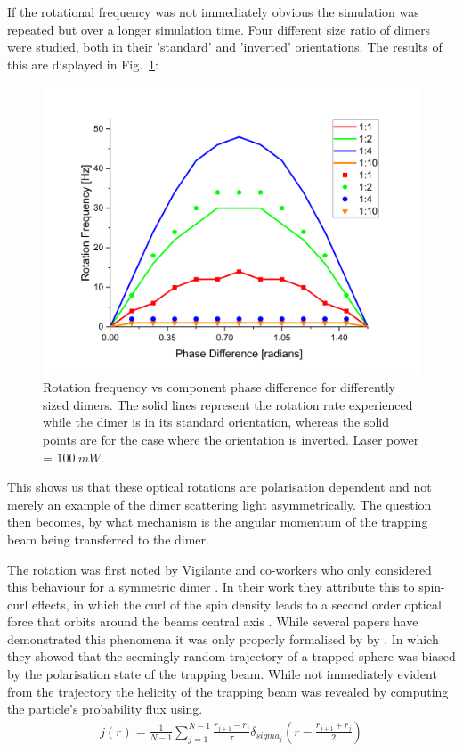 If the rotational frequency was not immediately obvious the simulation was
repeated but over a longer simulation time. Four different size ratio of 
dimers were studied, both in their 'standard' and 'inverted' orientations. 
The results of this are displayed in Fig.~\ref{fig:rotation_vs_pol}:
\begin{figure}[h!]
	\centering
	\includegraphics[width=\linewidth]{rotation_vs_pol.png}
	\caption{Rotation frequency vs component phase difference for 
		differently sized dimers. The solid lines represent the 
		rotation rate experienced while the dimer is in its standard 
		orientation, whereas the solid points are for the case 
		where the orientation is inverted. Laser power = $100\ mW$.}
	\label{fig:rotation_vs_pol}
\end{figure}

This shows us that these optical rotations are polarisation dependent 
and not merely an example of the dimer scattering light asymmetrically. 
The question then becomes, by what mechanism is the angular momentum of
the trapping beam being transferred to the dimer.

The rotation was first noted by Vigilante and co-workers who only 
considered this behaviour for a symmetric dimer \cite{Vigilante2020}.
In their work they attribute this to spin-curl effects, in which the 
curl of the spin density leads to a second order optical force that 
orbits around the beams central axis \cite{Yevick2017}. While several 
papers have demonstrated this phenomena \cite{Zhao2007,Zhao2009, Wang2010} 
it was only properly formalised by by \cite{Ruffner2012}. In which they 
showed that the seemingly random trajectory of a trapped sphere was biased
by the polarisation state of the trapping beam. While not immediately 
evident from the trajectory the helicity of the trapping beam was revealed 
by computing the particle's probability flux using.
\begin{align}
	j(r) = \frac{1}{N-1} \sum_{j=1}^{N-1}
	\frac{r_{j+1}-r_j}{\tau}\delta_{sigma_j}\left(r-\frac{r_{j+1}+r_j}{2}\right)
	\label{eq:prob_flux}
\end{align}

